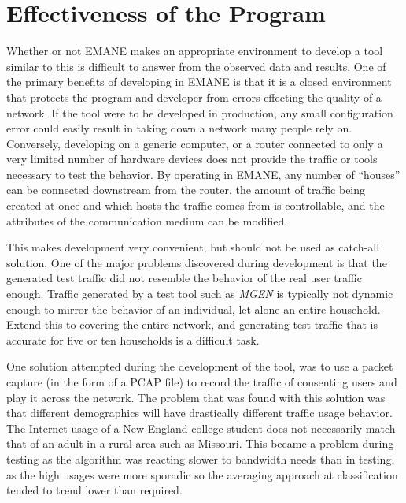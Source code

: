 \section{Effectiveness of the Program}
Whether or not EMANE makes an appropriate environment to develop a tool similar to this is difficult to answer from the observed data and results.
One of the primary benefits of developing in EMANE is that it is a closed environment that protects the program and developer from errors effecting the quality of a network.
If the tool were to be developed in production, any small configuration error could easily result in taking down a network many people rely on.
Conversely, developing on a generic computer, or a router connected to only a very limited number of hardware devices does not provide the traffic or tools necessary to test the behavior.
By operating in EMANE, any number of ``houses'' can be connected downstream from the router, the amount of traffic being created at once and which hosts the traffic comes from is controllable, and the attributes of the communication medium can be modified.\par
This makes development very convenient, but should not be used as catch-all solution.
One of the major problems discovered during development is that the generated test traffic did not resemble the behavior of the real user traffic enough.
Traffic generated by a test tool such as \textit{MGEN} is typically not dynamic enough to mirror the behavior of an individual, let alone an entire household.
Extend this to covering the entire network, and generating test traffic that is accurate for five or ten households is a difficult task.\par
One solution attempted during the development of the tool, was to use a packet capture (in the form of a PCAP file) to record the traffic of consenting users and play it across the network.
The problem that was found with this solution was that different demographics will have drastically different traffic usage behavior.
The Internet usage of a New England college student does not necessarily match that of an adult in a rural area such as Missouri.
This became a problem during testing as the algorithm was reacting slower to bandwidth needs than in testing, as the high usages were more sporadic so the averaging approach at classification tended to trend lower than required.\par
